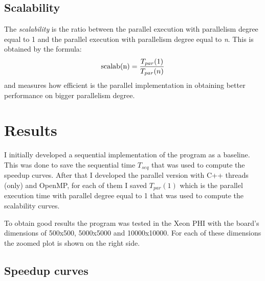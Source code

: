 \documentclass[a4paper,10pt]{article}
\begin{document}
\subsection{Scalability}
The \textit{scalability} is the ratio between the parallel execution with parallelism degree equal to 1 and the parallel execution with parallelism degree equal to \textit{n}. This is obtained by the formula:
\begin{equation}
\textnormal{scalab(n)} = \frac{T_{par}(1)}{T_{par}(n)}
\end{equation}
and measures how efficient is the parallel implementation in obtaining better performance on bigger parallelism degree.
\section{Results}
I initially developed a sequential implementation of the program as a baseline. This was done to save the sequential time $T_{seq}$ that was used to compute the speedup curves. After that I developed the parallel version with C++ threads (only) and OpenMP, for each of them I saved $T_{par}(1)$ which is the parallel execution time with parallel degree equal to 1 that was used to compute the scalability curves. 

To obtain good results the program was tested in the Xeon PHI with the board's dimensions of 500x500, 5000x5000 and 10000x10000. For each of these dimensions the zoomed plot is shown on the right side. 



\subsection{Speedup curves}
\end{document}
